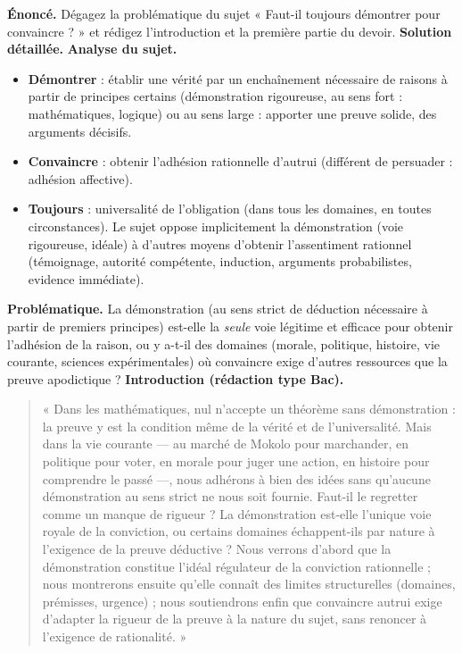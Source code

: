 \documentclass[11pt]{article}
\begin{document}
\begin{exoresolu}
\textbf{Énoncé.} Dégagez la problématique du sujet « Faut-il toujours démontrer pour convaincre ? » et rédigez l'introduction et la première partie du devoir.
\tcblower
\textbf{Solution détaillée.}
\textbf{Analyse du sujet.}
\begin{itemize}
\item \textbf{Démontrer} : établir une vérité par un enchaînement nécessaire de raisons à partir de principes certains (démonstration rigoureuse, au sens fort : mathématiques, logique) ou au sens large : apporter une preuve solide, des arguments décisifs.
\item \textbf{Convaincre} : obtenir l'adhésion rationnelle d'autrui (différent de persuader : adhésion affective).
\item \textbf{Toujours} : universalité de l'obligation (dans tous les domaines, en toutes circonstances). Le sujet oppose implicitement la démonstration (voie rigoureuse, idéale) à d'autres moyens d'obtenir l'assentiment rationnel (témoignage, autorité compétente, induction, arguments probabilistes, evidence immédiate).
\end{itemize}
\textbf{Problématique.} La démonstration (au sens strict de déduction nécessaire à partir de premiers principes) est-elle la \emph{seule} voie légitime et efficace pour obtenir l'adhésion de la raison, ou y a-t-il des domaines (morale, politique, histoire, vie courante, sciences expérimentales) où convaincre exige d'autres ressources que la preuve apodictique ?
\textbf{Introduction (rédaction type Bac).}
\begin{quote}
« Dans les mathématiques, nul n'accepte un théorème sans démonstration : la preuve y est la condition même de la vérité et de l'universalité. Mais dans la vie courante — au marché de Mokolo pour marchander, en politique pour voter, en morale pour juger une action, en histoire pour comprendre le passé —, nous adhérons à bien des idées sans qu'aucune démonstration au sens strict ne nous soit fournie. Faut-il le regretter comme un manque de rigueur ? La démonstration est-elle l'unique voie royale de la conviction, ou certains domaines échappent-ils par nature à l'exigence de la preuve déductive ? Nous verrons d'abord que la démonstration constitue l'idéal régulateur de la conviction rationnelle ; nous montrerons ensuite qu'elle connaît des limites structurelles (domaines, prémisses, urgence) ; nous soutiendrons enfin que convaincre autrui exige d'adapter la rigueur de la preuve à la nature du sujet, sans renoncer à l'exigence de rationalité. »

\end{quote}
\end{exoresolu}
\end{document}
